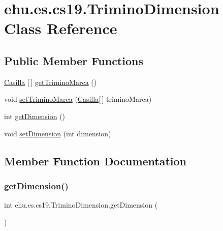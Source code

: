\hypertarget{classehu_1_1es_1_1cs19_1_1_trimino_dimension}{}\section{ehu.\+es.\+cs19.\+Trimino\+Dimension Class Reference}
\label{classehu_1_1es_1_1cs19_1_1_trimino_dimension}
\subsection*{Public Member Functions}
\begin{DoxyCompactItemize}
\item 
\mbox{\hyperlink{classehu_1_1es_1_1cs19_1_1_casilla}{Casilla}} \mbox{[}$\,$\mbox{]} \mbox{\hyperlink{classehu_1_1es_1_1cs19_1_1_trimino_dimension_ab118d4a9c1c1083603ff3077f7ecbfd1}{get\+Trimino\+Marca}} ()
\item 
void \mbox{\hyperlink{classehu_1_1es_1_1cs19_1_1_trimino_dimension_aaeade544742af28d18c2ff5cf2b6018f}{set\+Trimino\+Marca}} (\mbox{\hyperlink{classehu_1_1es_1_1cs19_1_1_casilla}{Casilla}}\mbox{[}$\,$\mbox{]} trimino\+Marca)
\item 
int \mbox{\hyperlink{classehu_1_1es_1_1cs19_1_1_trimino_dimension_a0170a1569ea9bc62a5aee865f78b65f8}{get\+Dimension}} ()
\item 
void \mbox{\hyperlink{classehu_1_1es_1_1cs19_1_1_trimino_dimension_a92ff7c07e131101fc275ca7b1b92d0d1}{set\+Dimension}} (int dimension)
\end{DoxyCompactItemize}


\subsection{Member Function Documentation}
\mbox{\label{classehu_1_1es_1_1cs19_1_1_trimino_dimension_a0170a1569ea9bc62a5aee865f78b65f8}} 
\subsubsection{\texorpdfstring{getDimension()}{getDimension()}}
{\footnotesize\ttfamily int ehu.\+es.\+cs19.\+Trimino\+Dimension.\+get\+Dimension (\begin{DoxyParamCaption}{ }\end{DoxyParamCaption})}

